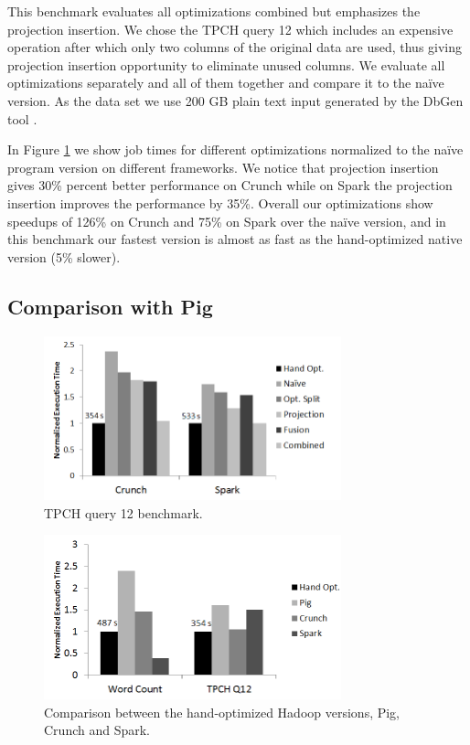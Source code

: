 This benchmark evaluates all optimizations combined but emphasizes the
projection insertion. We chose the TPCH query 12 which includes an expensive
 operation after which only two columns of the original data are
used, thus giving projection insertion opportunity to eliminate unused columns.
We evaluate all optimizations separately and all of them together and compare it
to the na\"{i}ve version. As the data set we use 200 GB plain text input
generated by the DbGen tool \cite{tpch}.

In Figure \ref{fig:tpch} we show job times for different optimizations
normalized to the na\"{i}ve program version on different frameworks. We notice
that projection insertion gives 30\% percent better performance on Crunch while
on Spark the projection insertion improves the performance by 35\%. Overall our
optimizations show speedups of 126\% on Crunch and 75\% on Spark over the na\"{i}ve
version, and in this benchmark our fastest version is almost as fast as the
hand-optimized native version (5\% slower).


\subsection{Comparison with Pig}
\label{subsec:pig}
\begin{figure}[t]
    \includegraphics[width=8.6cm]{figures/tpch.png}
   \caption{TPCH query 12 benchmark.}
  \label{fig:tpch}%
\end{figure}
\begin{figure}[t]
    \includegraphics[width=8.6cm]{figures/pig.png}
   \caption{Comparison between the hand-optimized Hadoop versions, Pig, Crunch
   and Spark.}
   \label{fig:pig}%
\end{figure}

